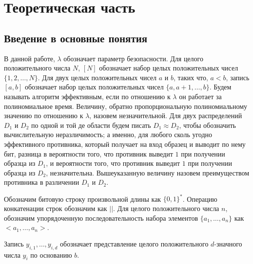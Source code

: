 \chapter{Теоретическая часть}
\section{Введение в основные понятия} %
В данной работе, $\lambda$ обозначает параметр безопасности.
Для целого положительного числа $N$, $[N]$ обозначает набор целых положительных чисел $\{1, 2, \dots, N\}$.
Для двух целых положительных чисел $a$ и $b$, таких что, $a < b$, запись $[a, b]$ обозначает набор целых положительных чисел $\{a, a + 1, \dots, b\}$.
Будем называть алгоритм эффективным, если по отношению к $\lambda$ он работает за полиномиальное время.
Величину, обратно пропорциональную полиномиальному значению по отношению к $\lambda$, назовем незначительной.
Для двух распределений $D_1$ и $D_2$ по одной и той де области будем писать $D_1 \approx D_2$, чтобы обозначить вычислительную неразличимость; а именно, для любого сколь угодно эффективного противника, который получает на вход образец и выводит по нему бит, разница в вероятности того, что противник выведит $1$ при получении образца из $D_1$, и вероятности того, что противник выведит $1$ при получении образца из $D_2$, незначительна.
Вышеуказанную величину назовем преимуществом противника в различении $D_1$ и $D_2$.

Обозначим битовую строку произвольной длины как $\{0, 1\}^*$.
Операцию конкатенации строк обозначим как $||$.
Для целого положительного числа $n$, обозначим упорядоченную последовательность набора элементов $\{a_1, \dots, a_n\}$ как $<a_1, \dots, a_n>$.

Запись $y_{i, 1}, \dots, y_{i, d}$ обозначает представление целого положительного $d$-значного числа $y_i$ по основанию $b$.

